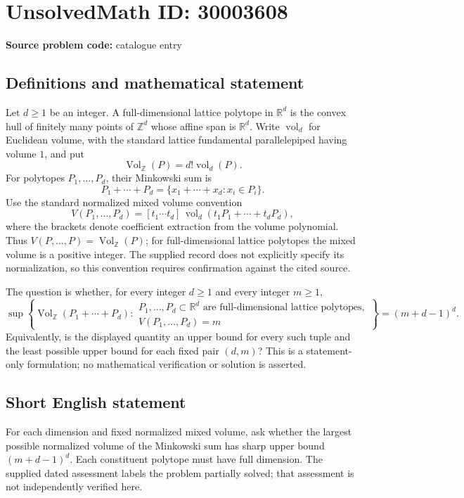 \documentclass[11pt]{article}
\newcommand{\Z}{\mathbb{Z}}
\newcommand{\R}{\mathbb{R}}
\begin{document}
\section*{UnsolvedMath ID: 30003608}
\textbf{Source problem code:} catalogue entry
\subsection{Definitions and mathematical statement}
Let \(d\geq 1\) be an integer. A full-dimensional lattice polytope in \(\R^d\) is the convex hull of finitely many points of \(\Z^d\) whose affine span is \(\R^d\). Write \(\operatorname{vol}_d\) for Euclidean volume, with the standard lattice fundamental parallelepiped having volume \(1\), and put
\[
\operatorname{Vol}_{\Z}(P)=d!\operatorname{vol}_d(P).
\]
For polytopes \(P_1,\ldots,P_d\), their Minkowski sum is
\[
P_1+\cdots+P_d=\{x_1+\cdots+x_d:x_i\in P_i\}.
\]
Use the standard normalized mixed volume convention
\[
V(P_1,\ldots,P_d)
=[t_1\cdots t_d]\,\operatorname{vol}_d(t_1P_1+\cdots+t_dP_d),
\]
where the brackets denote coefficient extraction from the volume polynomial. Thus \(V(P,\ldots,P)=\operatorname{Vol}_{\Z}(P)\); for full-dimensional lattice polytopes the mixed volume is a positive integer. The supplied record does not explicitly specify its normalization, so this convention requires confirmation against the cited source.

The question is whether, for every integer \(d\geq1\) and every integer \(m\geq1\),
\[
\sup\left\{
\operatorname{Vol}_{\Z}(P_1+\cdots+P_d):
\begin{array}{l}
P_1,\ldots,P_d\subset\R^d\text{ are full-dimensional lattice polytopes},\\
V(P_1,\ldots,P_d)=m
\end{array}
\right\}
=(m+d-1)^d.
\]
Equivalently, is the displayed quantity an upper bound for every such tuple and the least possible upper bound for each fixed pair \((d,m)\)? This is a statement-only formulation; no mathematical verification or solution is asserted.
\subsection{Short English statement}
For each dimension and fixed normalized mixed volume, ask whether the largest possible normalized volume of the Minkowski sum has sharp upper bound \((m+d-1)^d\). Each constituent polytope must have full dimension. The supplied dated assessment labels the problem partially solved; that assessment is not independently verified here.
\end{document}
